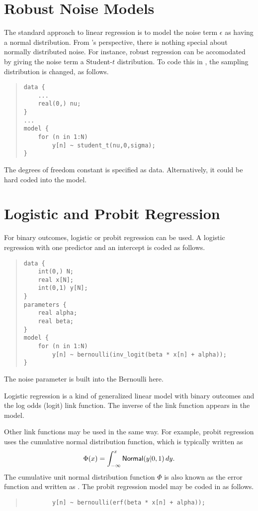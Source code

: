 \section{Robust Noise Models}

The standard approach to linear regression is to model the noise
term $\epsilon$ as having a normal distribution.  From \Stan's
perspective, there is nothing special about normally distributed
noise.  For instance, robust regression can be accomodated by giving
the noise term a Student-$t$ distribution.  To code this in \Stan, the
sampling distribution is changed, as follows.
%
\begin{quote}
\begin{Verbatim}
data {
    ...
    real(0,) nu;
}
...
model {
    for (n in 1:N)
        y[n] ~ student_t(nu,0,sigma);
}
\end{Verbatim}
\end{quote}
%
The degrees of freedom constant  is specified as data.
Alternatively, it could be hard coded into the model.

\section{Logistic and Probit Regression}

For binary outcomes, logistic or probit regression can be used.  A
logistic regression with one predictor and an intercept is coded as
follows. 
%
\begin{quote}
\begin{Verbatim}
data {
    int(0,) N;
    real x[N];
    int(0,1) y[N];
}
parameters {
    real alpha;
    real beta;
}
model {
    for (n in 1:N)
        y[n] ~ bernoulli(inv_logit(beta * x[n] + alpha));
} 
\end{Verbatim}
\end{quote}
%
The noise parameter is built into the Bernoulli here.  

Logistic regression is a kind of generalized linear model with binary
outcomes and the log odds (logit) link function.  The inverse of the
link function appears in the model.  

Other link functions may be used in the same way.  For example, probit
regression uses the cumulative normal distribution function, which is
typically written as 
\[
\Phi(x) = \int_{-\infty}^x \mbox{\sf Normal}(y|0,1) \, dy.
\]
%
The cumulative unit normal distribution function $\Phi$ is also known
as the error function and written as .  The probit
regression model may be coded in \Stan as follows.
%
\begin{quote}
\begin{Verbatim}
        y[n] ~ bernoulli(erf(beta * x[n] + alpha));
\end{Verbatim}
\end{quote}

